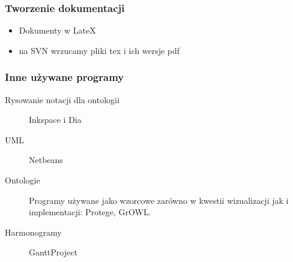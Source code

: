 \subsubsection{Tworzenie dokumentacji}
\begin{itemize}
 	\item Dokumenty w LateX
	\item na SVN wrzucamy pliki tex i ich wersje pdf
\end{itemize}


\subsubsection{Inne używane programy}
\begin{description}
 \item[Rysowanie notacji dla ontologii]  Inkspace i Dia
 \item[UML] Netbeans
 \item[Ontologie] Programy używane jako wzorcowe zarówno w kwestii wizualizacji jak i implementacji: Protege, GrOWL.
 \item[Harmonogramy] GanttProject
\end{description}

